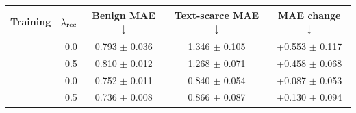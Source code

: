 \begin{tabular}{lrccc}
\toprule
Training & $\lambda_{\rm rec}$ & Benign MAE $\downarrow$ & Text-scarce MAE $\downarrow$ & MAE change $\downarrow$ \\
\midrule
\tokenlevel{} & 0.0 & 0.793 $\pm$ 0.036 & 1.346 $\pm$ 0.105 & +0.553 $\pm$ 0.117 \\
\tokenlevel{} & 0.5 & 0.810 $\pm$ 0.012 & 1.268 $\pm$ 0.071 & +0.458 $\pm$ 0.068 \\
\modlevel{} & 0.0 & 0.752 $\pm$ 0.011 & 0.840 $\pm$ 0.054 & +0.087 $\pm$ 0.053 \\
\modlevel{} & 0.5 & 0.736 $\pm$ 0.008 & 0.866 $\pm$ 0.087 & +0.130 $\pm$ 0.094 \\
\bottomrule
\end{tabular}
